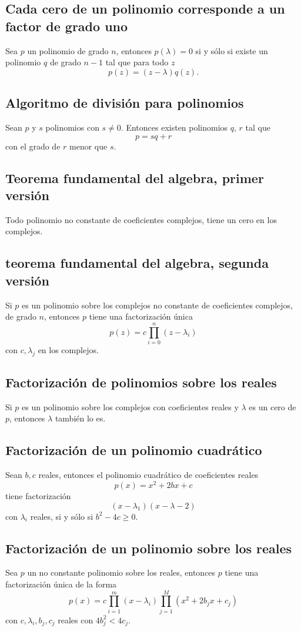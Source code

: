 \documentclass{article}
\begin{document}
\subsection{Cada cero de un polinomio corresponde a un factor de grado uno}
Sea $p$ un polinomio de grado $n$, entonces
$p(\lambda) = 0$ si y sólo si existe un polinomio $q$
de grado $n-1$ tal que para todo $z$
$$p(z)=(z-\lambda)q(z).$$

\subsection{Algoritmo de división para polinomios}
Sean $p$ y $s$ polinomios con $s\neq 0$. Entonces existen
polinomios $q$, $r$ tal que
$$p=sq+r$$
con el grado de $r$ menor que $s$.

\subsection{Teorema fundamental del algebra, primer versión}
Todo polinomio no constante de coeficientes complejos, tiene
un cero en los complejos.

\subsection{teorema fundamental del algebra, segunda versión}
Si $p$ es un polinomio sobre los complejos no constante de 
coeficientes complejos, de grado $n$,
entonces $p$ tiene una factorización única
$$p(z)=c\prod^n_{i=0}(z-\lambda_i)$$
con $c,\lambda_j$ en los complejos.

\subsection{Factorización de polinomios sobre los reales}
Si $p$ es un polinomio sobre los complejos con coeficientes 
reales y $\lambda$ es un cero de $p$, entonces $\lambda$ también
lo es.

\subsection{Factorización de un polinomio cuadrático}
Sean $b,c$ reales, entonces el polinomio cuadrático de
coeficientes reales
$$p(x)=x^2+2bx+c$$
tiene factorización
$$(x-\lambda_1)(x-\lambda-2)$$
con $\lambda_i$ reales, si y sólo si
$b^2-4c\geq 0$.

\subsection{Factorización de un polinomio sobre los reales}
Sea $p$ un no constante polinomio sobre los reales, entonces
$p$ tiene una factorización única de la forma
$$p(x) = c\prod^m_{i=1}(x-\lambda_i)
\prod^M_{j=1}(x^2+2b_jx+c_j)$$
con $c,\lambda_i,b_j,c_j$ reales con $4b^2_j < 4c_j$.
\newpage
\end{document}
